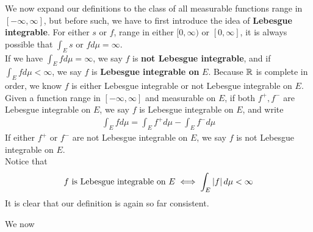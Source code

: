 \documentclass{report}
\begin{document}
\begin{mdframed}
We now expand our definitions to the class of all measurable functions range in $[-\infty,\infty]$, but before such, we have to first introduce the idea of \textbf{Lebesgue integrable}. For either $s$ or  $f$, range in either $[0,\infty)$ or $[0,\infty]$, it is always possible that $\int_E s\text{ or }fd\mu=\infty$.\\ 

If we have $\int_Efd\mu=\infty$, we say $f$ is \textbf{not Lebesgue integrable}, and if $\int_Efd\mu<\infty$, we say $f$ is \textbf{Lebesgue integrable on }$E$. Because $\mathbb{R}$ is complete in order, we know $f$ is either Lebesgue integrable or not Lebesgue integrable on $E$.\\

Given a function range in $[-\infty,\infty]$ and measurable on $E$, if both $f^+,f^-$ are Lebesgue integrable on $E$, we say  $f$ is Lebesgue integrable on $E$, and write 
\begin{align*}
\int_E fd\mu= \int_E f^+d\mu- \int_E f^-d\mu
\end{align*}
If either  $f^+$ or  $f^-$ are not Lebesgue integrable on $E$, we say $f$ is not Lebesgue integrable on $E$.\\

Notice that 
\begin{align*}
f\text{ is Lebesgue integrable on }E\iff \int_E \left|f\right|d\mu<\infty
\end{align*}
It is clear that our definition is again so far consistent.
\end{mdframed}
\begin{mdframed}
We now 
\end{mdframed}
\end{document}
